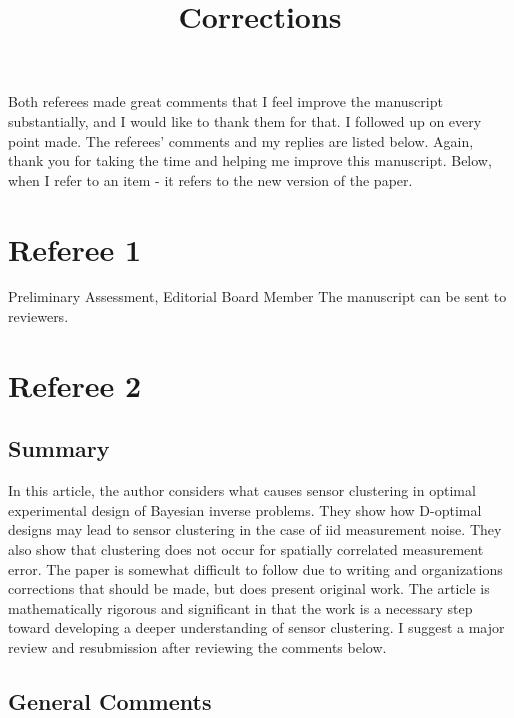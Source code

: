 \documentclass{amsart}
\title{Corrections}
\begin{document}
\maketitle

Both referees made great comments that I feel improve the manuscript
substantially, and I would like to thank them for that. I followed up
on every point made. The referees' comments and my replies are listed
below. Again, thank you for taking the time and helping me improve
this manuscript. Below, when I refer to an item - it refers to the new
version of the paper.

\section{Referee 1}
Preliminary Assessment, Editorial Board Member The manuscript can be
sent to reviewers.


\section{Referee 2}
\subsection{Summary}
In this article, the author considers what causes sensor clustering in
optimal experimental design of Bayesian inverse problems. They show
how D-optimal designs may lead to sensor clustering in the case of iid
measurement noise. They also show that clustering does not occur for
spatially correlated measurement error. The paper is somewhat
difficult to follow due to writing and organizations corrections that
should be made, but does present original work. The article is
mathematically rigorous and significant in that the work is a
necessary step toward developing a deeper understanding of sensor
clustering. I suggest a major review and resubmission after reviewing
the comments below.


\subsection{General Comments}
\end{document}
